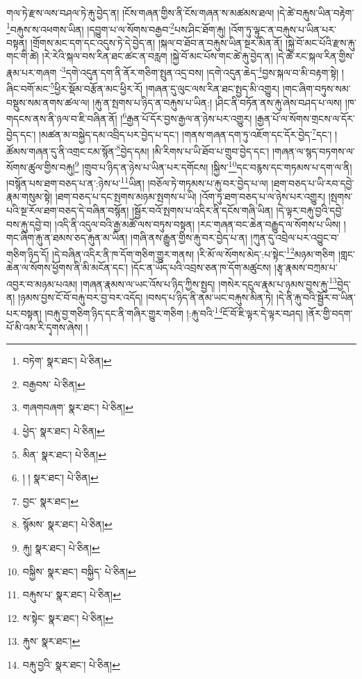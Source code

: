 གལ་ཏེ་རྫས་ལས་བཤལ་ཏེ་རྐུ་བྱེད་ན། །ངོས་གཞན་གྱིས་ནི་ངོས་གཞན་ས་མཚམས་ཐལ། །དེ་ཚེ་བརྐུས་ཡིན་བརྟེག་\footnote{བཏེག་  སྣར་ཐང་།  པེ་ཅིན། }བརྐུས་ས་འཕགས་ཡིན། །དབྱུག་པ་ལ་སོགས་བརྒྱབ་\footnote{བརྒྱབས་  པེ་ཅིན། }པས་ཤིང་ཐོག་རྐུ། །འོག་ཏུ་ལྟུང་ན་བརྐུས་པ་ཡིན་པར་བསྟན། །གྲོགས་མང་དག་དང་འདུས་ཏེ་དེ་བྱེད་ན། །སྐལ་བ་ཐོབ་ན་བརྐུས་ཡིན་སྔར་མིན་ནོ། །སྐྱེ་བོ་མང་པོའི་རྫས་རྐུ་གང་གི་ཚེ། །རེ་རེའི་སྐལ་བས་རིན་ཐང་ཚང་ན་བརླག །སྐྱེ་བོ་མང་པོས་གང་ཚེ་རྐུ་བྱེད་ན། །དེ་ཚེ་རང་སྐལ་རིན་གྱིས་རྣམ་པར་གཞག ་\footnote{གཞགབཞག་  སྣར་ཐང་།  པེ་ཅིན། }དགེ་འདུན་དག་ནི་ནོར་གཅིག་སྤུན་འདྲ་བས། །དགེ་འདུན་ཆེད་\footnote{ཕྱེད་  སྣར་ཐང་།  པེ་ཅིན། }བྱས་སྐལ་བ་མི་བརྟག་སྟེ། །ཞིང་བགོ་མང་\footnote{མིན་  སྣར་ཐང་།  པེ་ཅིན། }ཕྱིར་སྡོམ་བརྩོན་མང་ཕྱིར་རོ། །གཞན་དུ་ལུང་ལས་རིན་ཐང་སྤྱད་མི་འགྱུར། །གང་ཞིག་བཏུས་སམ་བསྡུས་སམ་ནགས་ཚལ་ལ། །རྐུ་ན་སྤགས་པ་ཉིད་ན་བརྐུས་པ་ཡིན:། །ཤིང་ནི་བཏོན་ནས་རྐུ་ཞེས་བཤད་པ་ལས། །ཁ་གདངས་ནས་ནི་ཉལ་བ་ཇི་བཞིན་ནོ། །\footnote{། །  སྣར་ཐང་།  པེ་ཅིན། }རྒྱན་པོ་དོར་བྱས་རྒྱལ་ན་ཉེས་པར་འགྱུར། །རྒྱན་པོ་ལ་སོགས་གྲངས་ལ་དོར་བྱེད་དང་། །མཚན་མ་བསྐྱེད་དམ་འབྲིད་པར་བྱེད་པ་དང་། །གནས་གཞན་དག་ཏུ་འཇོག་དང་དོར་བྱེད་\footnote{བྱང་  སྣར་ཐང་། }དང་། །ཚོམས་གཞན་དུ་ནི་འགྲང་ངམ་སྙོན་\footnote{སྙོམས་  སྣར་ཐང་།  པེ་ཅིན། }བྱེད་དམ། །མི་རིགས་པ་ཡི་ཐོབ་པ་གྲུབ་བྱེད་དང་། །གཞན་ལ་སྙད་བཏགས་ལ་སོགས་ཚུལ་གྱིས་བརྐུ།\footnote{རྐུ།  སྣར་ཐང་།  པེ་ཅིན། } །གྲུབ་པ་ཉིད་ན་ཉེས་པ་ཡིན་པར་དགོངས། །སྐྱིས་\footnote{བསྐྱིས་  སྣར་ཐང་། བསྐྱིད་  པེ་ཅིན། }དང་བརྙས་དང་གཏམས་པ་དག་ལ་ནི། །བསྙོན་པས་ཐག་བཅད་པ་ན་:ཉེས་པ་\footnote{བརྐུས་པ་  སྣར་ཐང་།  པེ་ཅིན། }ཡིན། །བཅོལ་ཏེ་གཏམས་པ་རྐུ་བར་བྱེད་པ་ལ། །ཐག་བཅད་པ་ཡི་རབ་དབྱེ་རྣམ་གསུམ་སྟེ། །ཐག་བཅད་པ་དང་སྤགས་མཉམ་སྤགས་པ་ཡི། །འོག་ཏུ་ཐག་བཅད་པ་ལ་ཉེས་པར་འགྱུར། །སྤགས་པའི་སྔ་རོལ་ཐག་བཅད་དེ་བཞིན་བསྙོན། །སྦྱོར་བའོ་སྤགས་པ་འདིར་ནི་དངོས་གཞི་ཡིན། །དེ་ལྟར་བརྐུ་བྱའི་དབྱེ་བས་རྐུ་དབྱེ་བ། །འདི་ནི་འདུལ་བའི་རྒྱ་མཚོ་ལས་བཏུས་བསྟན། །རང་གཞན་བང་ཆེན་བརྒྱུད་ལ་སོགས་པ་ཡིས། །གང་ཞིག་རྐུ་ན་ཐམས་ཅད་རྐུན་མ་ཡིན། །གཞི་ནས་རྒྱུན་གྱིས་རྐུ་བར་བྱེད་པ་ན། །ཀུན་དུ་འབྲེལ་པར་འབྱུང་བ་གཅིག་ཉིད་དོ། །དེ་བཞིན་འདིར་ནི་ཁ་དོག་གཅིག་གྱུར་གནས། །རི་མོ་ལ་སོགས་མེད་:པ་སྟེང་\footnote{ས་སྟེང་  སྣར་ཐང་།  པེ་ཅིན། }མཉམ་གཅིག །གླང་ཆེན་ལ་སོགས་ཕྱོགས་ནི་མི་མངོན་དང་། །དོང་ན་ཡོད་པའི་འབྲས་ཅན་ཁ་དོག་མཚུངས། །རྩྭ་རྣམས་བཀྲམ་པ་འབྱར་བ་མཉམ་པའམ། །གཞན་རྣམས་ལ་ཡང་འོས་པ་ཉིད་ཀྱིས་སྤྱད། །གསེར་དངུལ་རྣམ་པ་ཉམས་བྱས་རྐུ་\footnote{རྐུས་  སྣར་ཐང་། }བྱེད་ན། །ཉམས་བྱས་ངོ་བོ་བརྐུ་བར་བྱ་བར་འདོད། །བསད་པ་ཉིད་ནི་ནམ་ཡང་བརྐུས་མིན་ཏེ། །དེ་ནི་རྐུ་བའི་སྦྱོར་བ་ཡིན་པར་བསྟན། །བརྐུ་བྱ་གཅིག་ཉིད་དང་ནི་གཞིར་གྱུར་གཅིག །:རྐུ་བའི་\footnote{བརྐུ་བྱའི་  སྣར་ཐང་།  པེ་ཅིན། }ངོ་བོ་ཇི་ལྟར་དེ་ལྟར་བཤད། །ནོར་གྱི་བདག་པོ་མི་འམ་རི་དྭགས་ཞེས། །
